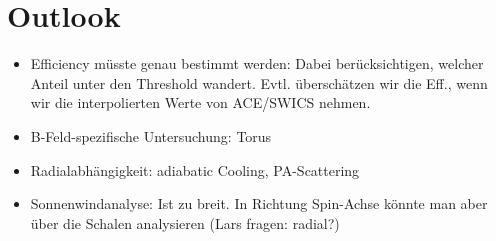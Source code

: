\section{Outlook}
\begin{itemize}
	\item Efficiency müsste genau bestimmt werden: Dabei berücksichtigen, welcher Anteil unter den Threshold wandert. Evtl. überschätzen wir die Eff., wenn wir die interpolierten Werte von ACE/SWICS nehmen.
	\item B-Feld-spezifische Untersuchung: Torus
	\item Radialabhängigkeit: adiabatic Cooling, PA-Scattering
	\item Sonnenwindanalyse: Ist zu breit. In Richtung Spin-Achse könnte man aber über die Schalen analysieren (Lars fragen: radial?)
	
\end{itemize}

